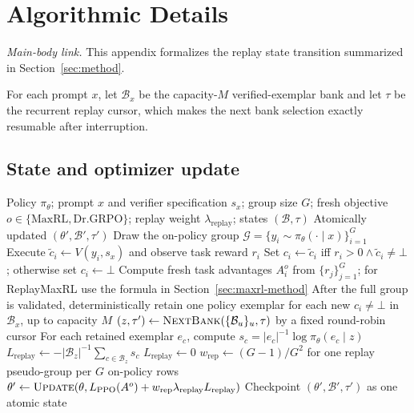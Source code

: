 \documentclass{article}
\newcommand{\1}{\mathbf 1}
\theoremstyle{remark}
\theoremstyle{definition}
\theoremstyle{plain}
\begin{document}
\clearpage
\section{Algorithmic Details}
\label{app:algorithm}

\noindent\emph{Main-body link.} This appendix formalizes the replay state
transition summarized in Section~\ref{sec:method}.

For each prompt $x$, let $\mathcal B_x$ be the capacity-$M$ verified-exemplar
bank and let $\tau$ be the recurrent replay cursor, which makes the next
bank selection exactly resumable after interruption.

\subsection{State and optimizer update}
\label{app:algorithm-update}

\begin{algorithm}[H]
  \caption{One ReplayMaxRL optimizer update}
  \label{alg:verified-replay-update}
  \small
  \begin{algorithmic}[1]
    \REQUIRE Policy $\pi_\theta$; prompt $x$ and verifier specification
      $s_x$; group size $G$; fresh objective $o\in\{\mathrm{MaxRL},\mathrm{Dr.GRPO}\}$; replay weight $\lambda_{\mathrm{replay}}$;
      states $(\mathcal B,\tau)$
    \ENSURE Atomically updated $(\theta',\mathcal B',\tau')$
    \STATE Draw the on-policy group
      $\mathcal G=\{y_i\sim\pi_\theta(\cdot\mid x)\}_{i=1}^G$
      \STATE Execute $\widetilde c_i\gets V(y_i,s_x)$ and observe task
        reward $r_i$
      \STATE Set $c_i\gets\widetilde c_i$ iff
        $r_i>0\wedge\widetilde c_i\ne\bot$; otherwise set $c_i\gets\bot$
    \ENDFOR
    \STATE Compute fresh task advantages $A_i^{o}$ from $\{r_j\}_{j=1}^G$; for ReplayMaxRL use the formula in Section~\ref{sec:maxrl-method}
    \STATE After the full group is validated, deterministically retain one
      policy exemplar for each new $c_i\ne\bot$ in $\mathcal B_x$, up to
      capacity $M$
    \STATE $(z,\tau')\gets\textsc{NextBank}
      (\{\mathcal B_u\}_u,\tau)$ by a fixed round-robin cursor
      \STATE For each retained exemplar $e_c$, compute
        $s_c=|e_c|^{-1}\log\pi_\theta(e_c\mid z)$
      \STATE $L_{\mathrm{replay}}\gets-|\mathcal B_z|^{-1}
        \sum_{c\in\mathcal B_z}s_c$
    \ELSE
      \STATE $L_{\mathrm{replay}}\gets0$
    \ENDIF
    \STATE $w_{\mathrm{rep}}\gets(G-1)/G^2$ for one replay
      pseudo-group per $G$ on-policy rows
    \STATE $\theta'\gets\textsc{Update}
      (\theta,L_{\mathrm{PPO}}(A^{o})
      +w_{\mathrm{rep}}\lambda_{\mathrm{replay}}L_{\mathrm{replay}})$
    \STATE Checkpoint $(\theta',\mathcal B',\tau')$ as one atomic state
\end{algorithmic}
\end{algorithm}
\end{document}
